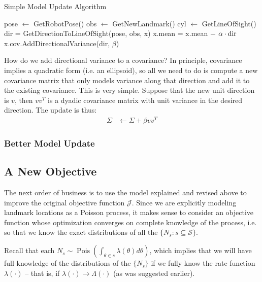 \documentclass[12pt]{article}
\DeclareMathOperator{\Pois}{Pois}
\begin{document}
\begin{algorithm}[H]
  \caption{Simple Model Update Algorithm}
  \label{simple_model_update_algorithm}
  \begin{algorithmic}
      \STATE pose $\leftarrow$ GetRobotPose()
      \STATE obs $\leftarrow$ GetNewLandmark()
      \STATE cyl $\leftarrow$ GetLineOfSight()
        \STATE dir = GetDirectionToLineOfSight(pose, obs, x)
        \STATE x.mean = x.mean $-$ $\alpha \cdot \textnormal{dir}$
        \STATE x.cov.AddDirectionalVariance(dir, $\beta$)
      \ENDFOR
    \ENDWHILE
  \end{algorithmic}
\end{algorithm}

How do we add directional variance to a covariance? In principle, covariance implies a quadratic form (i.e. an ellipsoid), so all we need to do is compute a new covariance matrix that only models variance along that direction and add it to the existing covariance. This is very simple. Suppose that the new unit direction is $v$, then $v v^T$ is a dyadic covariance matrix with unit variance in the desired direction. The update is thus:
\begin{align}
  \Sigma &\leftarrow \Sigma + \beta v v^T
\end{align}

\subsubsection{Better Model Update}


\subsection{A New Objective}

The next order of business is to use the model explained and revised above to improve the original objective function $\mathcal{J}$. Since we are explicitly modeling landmark locations as a Poisson process, it makes sense to consider an objective function whose optimization converges on complete knowledge of the process, i.e. so that we know the exact distributions of all the $\{N_s : s \subseteq \mathcal{S}\}$.

Recall that each $N_s \sim \Pois \left( \int_{\theta \in s} \lambda(\theta) d\theta \right)$, which implies that we will have full knowledge of the distributions of the $\{N_s\}$ if we fully know the rate function $\lambda(\cdot)$ -- that is, if $\lambda(\cdot) \rightarrow \Lambda(\cdot)$ (as was suggested earlier).
\end{document}
